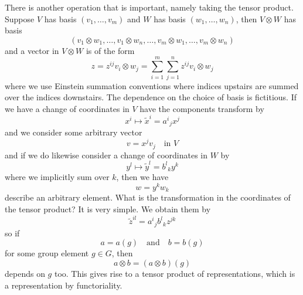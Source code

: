 There is another operation that is important, namely taking the
tensor product. Suppose $V$ has basis $(v_{1},\dots,v_{m})$ and
$W$ has basis $(w_{1},\dots,w_{n})$, then $V\otimes W$ has basis 
\begin{equation}
(v_{1}\otimes w_{1},\dots, v_{1}\otimes w_{n},\dots,v_{m}\otimes
  w_{1},\dots, v_{m}\otimes w_{n})
\end{equation}
and a vector in $V\otimes W$ is of the form
\begin{equation}
z = z^{ij}v_{i}\otimes w_{j} = \sum_{i=1}^{m}\sum_{j=1}^{n}z^{ij}v_{i}\otimes w_{j}
\end{equation}
where we use Einstein summation conventions where indices
upstairs are summed over the indices downstairs. The dependence
on the choice of basis is fictitious. If we have a change of
coordinates in $V$ have the components transform by
\begin{equation}
x^{i}\mapsto\widetilde{x}^{i} = {a^{i}}_{j}x^{j}
\end{equation}
and we consider some arbitrary vector
\begin{equation}
v=x^{j}v_{j}\quad\text{in }V
\end{equation}
and if we do likewise consider a change of coordinates in $W$ by
\begin{equation}
y^{l}\mapsto\widetilde{y}^{l}={b^{l}}_{k}y^{k}
\end{equation}
where we implicitly sum over $k$, then we have
\begin{equation}
w=y^{k}w_{k}
\end{equation}
describe an arbitrary element. What is the transformation in the
coordinates of the tensor product? It is very simple. We obtain
them by
\begin{equation}
\widetilde{z}^{il}={a^{i}}_{j}{b^{l}}_{k}z^{jk}
\end{equation}
so if
\begin{equation}
a=a(g)\quad\mbox{and}\quad b=b(g)
\end{equation}
for some group element $g\in G$, then
\begin{equation}
a\otimes b=(a\otimes b)(g)
\end{equation}
depends on $g$ too. This gives rise to a tensor product of
representations, which is a representation by functoriality.

